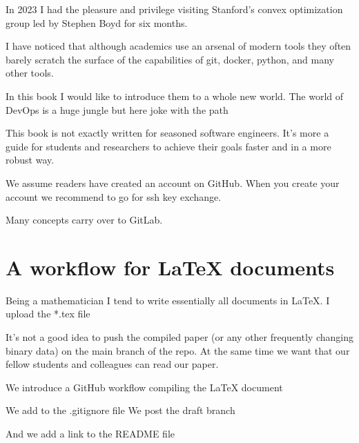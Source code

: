 

In 2023 I had the pleasure and privilege visiting Stanford's convex optimization group led by Stephen Boyd
for six months.

I have noticed that although academics use an arsenal of modern tools they often
barely scratch the surface of the capabilities of git, docker, python, and many other tools.

In this book I would like to introduce them to a whole new world. The world of DevOps
is a huge jungle but here joke with the path

This book is not exactly written for seasoned software engineers. It's more a guide
for students and researchers to achieve their goals faster and in a more robust way.

We assume readers have created an account on GitHub.
When you create your account we recommend to go for ssh key exchange.

Many concepts carry over to GitLab.

\section{A workflow for LaTeX documents}
Being a mathematician I tend to write essentially all documents in LaTeX.
I upload the *.tex file

It's not a good idea to push the compiled paper (or any other frequently changing binary data)
on the main branch of the repo. At the same time we want that our fellow students and colleagues
can read our paper.

We introduce a GitHub workflow compiling the LaTeX document




We add to the .gitignore file
We post the draft branch

And we add a link to the README file
